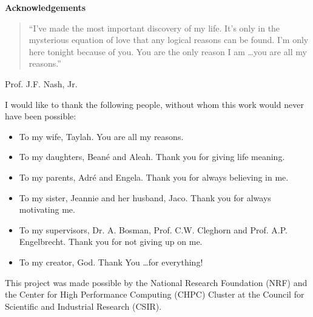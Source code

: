 \pagestyle{empty}
\begin{center}
    \Large
    \textbf{Acknowledgements}
\end{center}

\begin{quotation}
    \noindent
    ``I've made the most important discovery of my life. It's only in
    the mysterious equation of love that any logical reasons can be found. I'm
    only here tonight because of you. You are the only reason I am \ldots you are
    all my reasons.''
\end{quotation}
\begin{flushright}
    Prof. J.F. Nash, Jr.
\end{flushright}

\vspace{0.3cm}
\noindent
I would like to thank the following people, without whom this work would never
have been possible:

\begin{itemize}
    \item To my wife, Taylah. You are all my reasons.

    \item To my daughters, Bean\'e and  Aleah. Thank you for giving life meaning.

    \item To my parents, Adr\'e and Engela. Thank you for always believing in me.

    \item To my sister, Jeannie and her husband, Jaco. Thank you for always motivating me.

    \item To my supervisors, Dr. A. Bosman, Prof. C.W. Cleghorn and Prof. A.P. Engelbrecht. Thank you for not giving up on me.

    \item To my creator, God. Thank You \ldots for everything!
\end{itemize}

\vspace{\fill}

\begin{center}
    This project was made possible by the National Research Foundation (NRF) and the Center for High Performance Computing (CHPC) Cluster at the Council for Scientific and Industrial Research (CSIR).
\end{center}

\newpage
